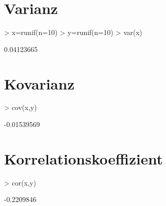 \section{Varianz}
\begin{Schunk}
\begin{Sinput}
> x=runif(n=10)
> y=runif(n=10)
> var(x)
\end{Sinput}
\begin{Soutput}
[1] 0.04123665
\end{Soutput}
\end{Schunk}

\section{Kovarianz}
\begin{Schunk}
\begin{Sinput}
> cov(x,y)
\end{Sinput}
\begin{Soutput}
[1] -0.01539569
\end{Soutput}
\end{Schunk}

\section{Korrelationskoeffizient}
\begin{Schunk}
\begin{Sinput}
> cor(x,y)
\end{Sinput}
\begin{Soutput}
[1] -0.2209846
\end{Soutput}
\end{Schunk}

